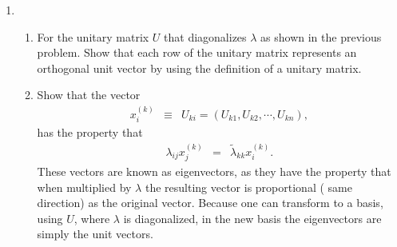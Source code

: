 \begin{enumerate}
\item
\begin{enumerate}
\item For the unitary matrix $U$ that diagonalizes $\lambda$ as shown in the previous problem. Show that each row of the unitary matrix represents an orthogonal unit vector by using the definition of a unitary matrix.
\item Show that the vector
\begin{eqnarray}
x_i^{(k)}&\equiv& U_{ki}=(U_{k1},U_{k2},\cdots,U_{kn}),
\end{eqnarray}
has the property that
\begin{eqnarray}
\lambda_{ij}x^{(k)}_j&=&\tilde{\lambda}_{kk}x^{(k)}_i.
\end{eqnarray}
These vectors are known as eigenvectors, as they have the property that when multiplied by $\lambda$ the resulting vector is proportional ( same direction) as the original vector. Because one can transform to a basis, using $U$, where $\lambda$ is diagonalized, in the new basis the eigenvectors are simply the unit vectors.
\end{enumerate}
\end{enumerate} 

